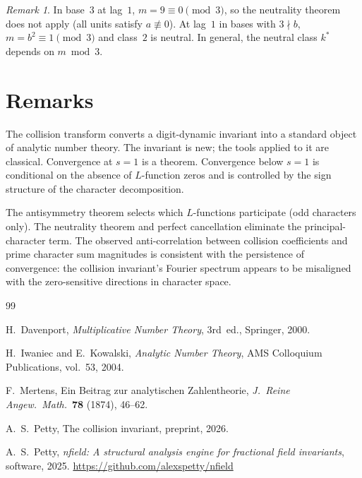 \documentclass[12pt]{amsart}
\theoremstyle{definition}
\theoremstyle{remark}
\newtheorem{remark}[theorem]{Remark}
\begin{document}
\begin{remark}
In base~$3$ at lag~$1$, $m = 9 \equiv 0 \pmod{3}$,
so the neutrality theorem does not apply (all units
satisfy $a \not\equiv 0$). At lag~$1$ in bases with
$3 \nmid b$, $m = b^2 \equiv 1 \pmod{3}$ and class~$2$
is neutral. In general, the neutral class $k^{*}$
depends on $m \bmod 3$.
\end{remark}

\section{Remarks}

The collision transform converts a digit-dynamic invariant
into a standard object of analytic number theory. The
invariant is new; the tools applied to it are classical.
Convergence at $s = 1$ is a theorem. Convergence below
$s = 1$ is conditional on the absence of $L$-function
zeros and is controlled by the sign structure of the
character decomposition.

The antisymmetry theorem selects which $L$-functions
participate (odd characters only). The neutrality theorem
and perfect cancellation eliminate the principal-character
term. The observed anti-correlation between collision
coefficients and prime character sum magnitudes is
consistent with the persistence of convergence: the
collision invariant's Fourier spectrum appears to be
misaligned with the zero-sensitive directions in
character space.

\begin{thebibliography}{99}

H.~Davenport,
\emph{Multiplicative Number Theory},
3rd~ed., Springer, 2000.

H.~Iwaniec and E.~Kowalski,
\emph{Analytic Number Theory},
AMS Colloquium Publications, vol.~53, 2004.

F.~Mertens,
Ein Beitrag zur analytischen Zahlentheorie,
\emph{J.\ Reine Angew.\ Math.}\ \textbf{78} (1874),
46--62.

A.~S.~Petty,
The collision invariant,
preprint, 2026.

A.~S.~Petty,
\emph{nfield: A structural analysis engine for fractional
field invariants},
software, 2025.
\url{https://github.com/alexspetty/nfield}

\end{thebibliography}
\end{document}
